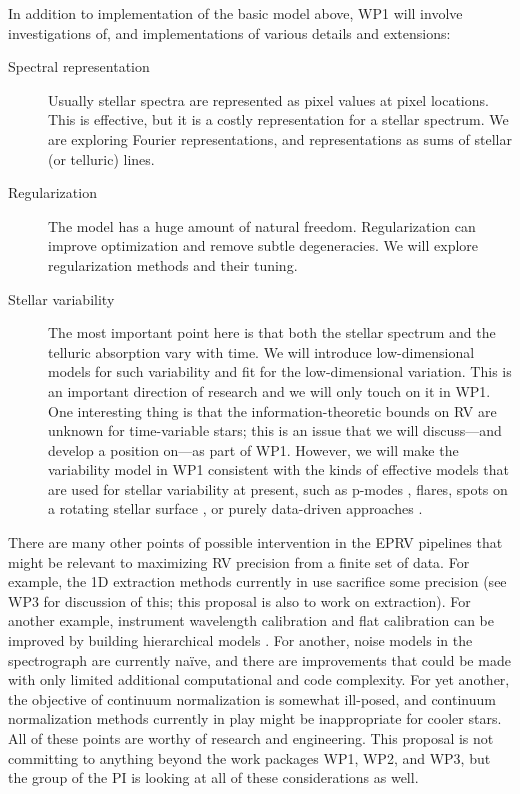 \documentclass[12pt]{article}
\begin{document}
In addition to implementation of the basic model above, WP1 will involve investigations of, and implementations of various details and extensions:
\begin{description}
\item[Spectral representation]
Usually stellar spectra are represented as pixel values at pixel locations. This is effective, but it is a costly representation for a stellar spectrum. We are exploring Fourier representations, and representations as sums of stellar (or telluric) lines.
\item[Regularization]
The model has a huge amount of natural freedom. Regularization can improve optimization and remove subtle degeneracies. We will explore regularization methods and their tuning.
\item[Stellar variability]
The most important point here is that both the stellar spectrum and the telluric absorption vary with time. We will introduce low-dimensional models for such variability and fit for the low-dimensional variation. This is an important direction of research and we will only touch on it in WP1. One interesting thing is that the information-theoretic bounds on RV are unknown for time-variable stars; this is an issue that we will discuss---and develop a position on---as part of WP1. However, we will make the variability model in WP1 consistent with the kinds of effective models that are used for stellar variability at present, such as p-modes \cite{chaplin}, flares, spots on a rotating stellar surface \cite{soap, starry}, or purely data-driven approaches \cite{nnstellaractivity}.
\end{description}

There are many other points of possible intervention in the EPRV pipelines that might be relevant to maximizing RV precision from a finite set of data.
For example, the 1D extraction methods currently in use sacrifice some precision (see WP3 for discussion of this; this proposal is also to work on extraction).
For another example, instrument wavelength calibration and flat calibration can be improved by building hierarchical models \cite{excalibur}.
For another, noise models in the spectrograph are currently na\"ive, and there are improvements that could be made with only limited additional computational and code complexity.
For yet another, the objective of continuum normalization is somewhat ill-posed, and continuum normalization methods currently in play might be inappropriate for cooler stars.
All of these points are worthy of research and engineering.
This proposal is not committing to anything beyond the work packages WP1, WP2, and WP3, but the group of the PI is looking at all of these considerations as well.
\end{document}
